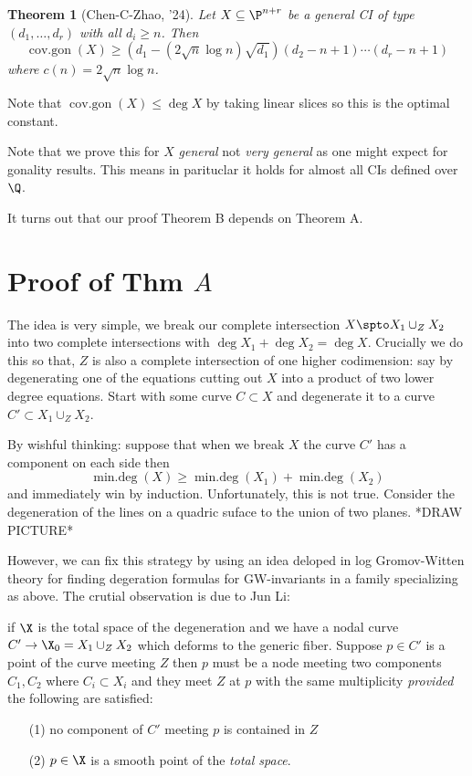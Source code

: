 \documentclass[12pt]{article}
\theoremstyle{plain}
\newtheorem{Lthm}{Theorem}
\DeclareMathOperator{\covgon}{cov.gon}
\DeclareMathOperator{\mindeg}{min.deg}
\begin{document}
\begin{Lthm}[Chen-C-Zhao, '24]
Let $X \subseteq \P^{n+r}$ be a general CI of type $(d_1, \dots, d_r)$ with all $d_i \ge n$. Then
\[ \covgon(X) \ge (d_1 - (2 \sqrt{n} \log{n}) \sqrt{d_1}) (d_2 - n + 1) \cdots (d_r - n + 1) \]
where $c(n) = 2 \sqrt{n} \log{n}$.
\end{Lthm}

\begin{rmk}
Note that $\covgon(X) \le \deg{X}$ by taking linear slices so this is the optimal constant.
\end{rmk}

\begin{rmk}
Note that we prove this for $X$ \textit{general} not \textit{very general} as one might expect for gonality results. This means in parituclar it holds for almost all CIs defined over $\Q$. 
\end{rmk}

{\color{red} It turns out that our proof Theorem B depends on Theorem A. }

\section{Proof of Thm $A$}

The idea is very simple, we break our complete intersection $X \spto X_1 \cup_Z X_2$ into two complete intersections with $\deg{X_1} + \deg{X_2} = \deg{X}$. {\color{red} Crucially we do this so that, $Z$ is also a complete intersection of one higher codimension: say by degenerating one of the equations cutting out $X$ into a product of two lower degree equations.} Start with some curve $C \subset X$ and degenerate it to a curve $C' \subset X_1 \cup_Z X_2$.
\par 
By wishful thinking: suppose that when we break $X$ the curve $C'$ has a component on each side then
\[ \mindeg(X) \ge \mindeg(X_1) + \mindeg(X_2) \]
and immediately win by induction. {\color{red} Unfortunately, this is not true. Consider the degeneration of the lines on a quadric suface to the union of two planes. *DRAW PICTURE*}
\par 
However, we can fix this strategy by using an idea deloped in log Gromov-Witten theory for finding degeration formulas for GW-invariants in a family specializing as above. The crutial observation is due to Jun Li:

if $\X$ is the total space of the degeneration and we have a nodal curve $C' \to \X_0 = X_1 \cup_Z X_2$ which deforms to the generic fiber. Suppose $p \in C'$ is a point of the curve meeting $Z$ then $p$ must be a node meeting two components $C_1, C_2$ where $C_i \subset X_i$ and they meet $Z$ at $p$ with the same multiplicity \textit{provided} the following are satisfied:
\begin{enumerate}
\item[(1)] no component of $C'$ meeting $p$ is contained in $Z$
\item[(2)] $p \in \X$ is a smooth point of the \textit{total space}.
\end{enumerate}
 
\end{document}
